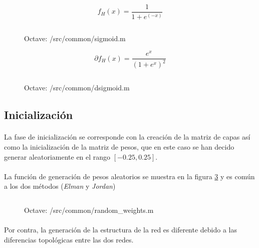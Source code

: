 \documentclass[10pt, a4paper,spanish]{article}
\begin{document}
			\begin{equation}
				f_H(x) = \frac{1}{1+e^(-x)}
			\end{equation}

			\begin{figure}[htpb!]
				\centering
				\inputminted{octave}{../src/common/sigmoid.m}
				\caption{Octave: /src/common/sigmoid.m}
				\label{code:sigmoid}
			\end{figure}

			\begin{equation}
				\partial f_H(x) = \frac{e^x}{(1 + e^x)^2}
			\end{equation}


			\begin{figure}[htpb!]
				\centering
				\inputminted{octave}{../src/common/dsigmoid.m}
				\caption{Octave: /src/common/dsigmoid.m}
				\label{code:dsigmoid}
			\end{figure}

		\subsection{Inicialización}

			\paragraph{}
			La fase de inicialización se corresponde con la creación de la matriz de capas así como la inicialización de la matriz de pesos, que en este caso se han decido generar aleatoriamente en el rango $[-0.25,0.25]$.

			\paragraph{}
			La función de generación de pesos aleatorios se muestra en la figura \ref{code:random_weights} y es común a los dos métodos (\emph{Elman} y \emph{Jordan})

			\begin{figure}[htpb!]
				\centering
				\inputminted{octave}{../src/common/random_weights.m}
				\caption{Octave: /src/common/random\_weights.m}
				\label{code:random_weights}
			\end{figure}

			\paragraph{}
			Por contra, la generación de la estructura de la red es diferente debido a las diferencias topológicas entre las dos redes.
\end{document}
